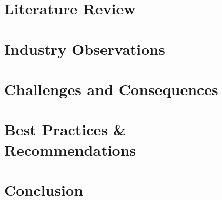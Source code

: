 \documentclass[a4Paper]{article}
\begin{document}
\section{Literature Review}
\section{Industry Observations}
\section{Challenges and Consequences}
\section{Best Practices \& Recommendations}
\section{Conclusion}
\pagebreak

%

%
\end{document}
